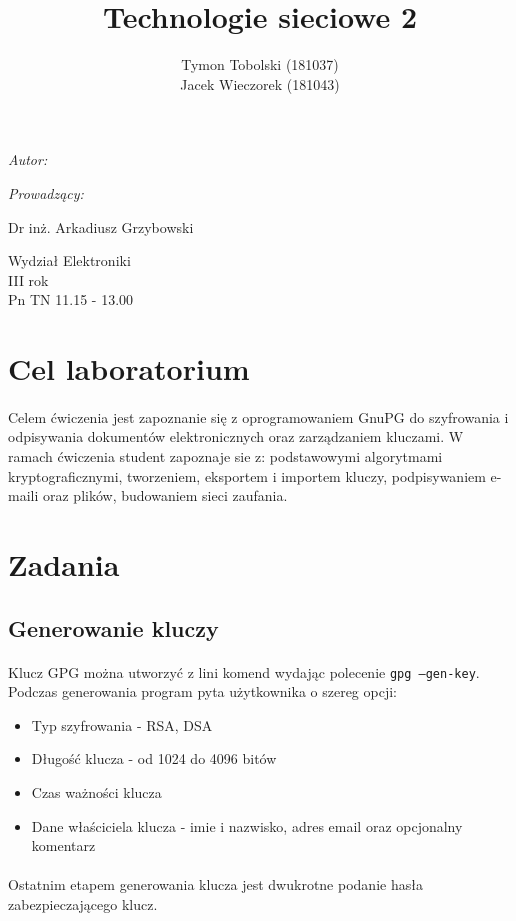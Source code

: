 \documentclass[wide,a4paper,titlepage,12pt] {article}
\title{Technologie sieciowe 2}
\author{Tymon Tobolski (181037)\\ Jacek Wieczorek (181043)}
\makeatletter
\renewcommand{\maketitle}{
\begin{titlepage}
  \begin{center}
    \vspace*{3cm}
    \LARGE \@title \par
    \vspace{2cm}
    \textit{\small Autor:}\par
    \normalsize \@author\par \normalsize
    \vspace{3cm}
    \textit{\small Prowadzący:}\par
    Dr inż. Arkadiusz Grzybowski\par
    \vspace{2cm}
    Wydział Elektroniki\\ III rok\\ Pn TN 11.15 - 13.00\par
    \vspace{4cm}
    \small \@date
  \end{center}
\end{titlepage}
}
\makeatother
\begin{document}
\maketitle
  \section{Cel laboratorium}
  \paragraph{}
  Celem ćwiczenia jest zapoznanie się z oprogramowaniem GnuPG do szyfrowania i odpisywania dokumentów elektronicznych oraz zarządzaniem kluczami. W ramach ćwiczenia student zapoznaje sie z: podstawowymi algorytmami kryptograficznymi, tworzeniem, eksportem i importem kluczy, podpisywaniem e-maili oraz plików, budowaniem sieci zaufania.

  \section{Zadania}
  \paragraph{}

  \subsection{Generowanie kluczy}
  \paragraph{}
  Klucz GPG można utworzyć z lini komend wydając polecenie \texttt{gpg --gen-key}.
  Podczas generowania program pyta użytkownika o szereg opcji:

  \begin{itemize}
    \item Typ szyfrowania - RSA, DSA
    \item Długość klucza - od 1024 do 4096 bitów
    \item Czas ważności klucza
    \item Dane właściciela klucza - imie i nazwisko, adres email oraz opcjonalny komentarz
  \end{itemize}

  \paragraph{}
  Ostatnim etapem generowania klucza jest dwukrotne podanie hasła zabezpieczającego klucz.
\end{document}
